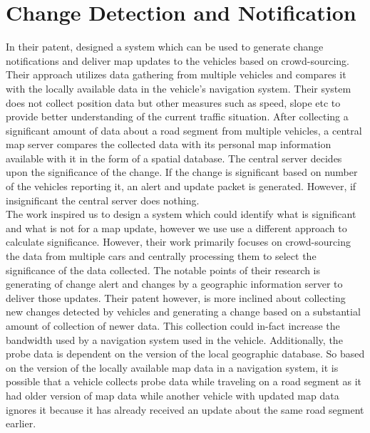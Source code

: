 \section{Change Detection and Notification}
In their patent, \citet{zavoli2008method} designed a system which can be used to generate change notifications and deliver map updates to the vehicles based on crowd-sourcing. Their approach utilizes data gathering from multiple vehicles and compares it with the locally available data in the vehicle's navigation system. Their system does not collect position data but other measures such as speed, slope etc to provide better understanding of the current traffic situation. After collecting a significant amount of data about a road segment from multiple vehicles, a central map server compares the collected data with its personal map information available with it in the form of a spatial database. The central server decides upon the significance of the change. If the change is significant based on number of the vehicles reporting it, an alert and update packet is generated. However, if insignificant the central server does nothing. \\

The work inspired us to design a system which could identify what is significant and what is not for a map update, however we use use a different approach to calculate significance. However, their work primarily focuses on crowd-sourcing the data from multiple cars and centrally processing them to select the significance of the data collected. The notable points of their research is generating of change alert and changes by a geographic information server to deliver those updates. Their patent however, is more inclined about collecting new changes detected by vehicles and generating a change based on a substantial amount of collection of newer data. This collection could in-fact increase the bandwidth used by a navigation system used in the vehicle. Additionally, the probe data is dependent on the version of the local geographic database. So based on the version of the locally available map data in a navigation system, it is possible that a vehicle collects probe data while traveling on a road segment as it had older version of map data while another vehicle with updated map data ignores it because it has already received an update about the same road segment earlier.


